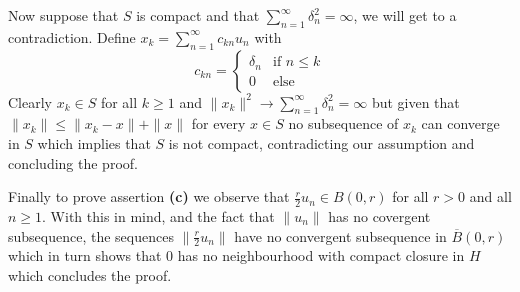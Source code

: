 \documentclass{article}
\begin{document}
\begin{exercise}
\bigbreak

Now suppose that $S$ is compact and that $\sum_{n=1}^{\infty} \delta_n^2 = \infty $, we will get to a contradiction. Define $x_k = \sum_{n=1}^{\infty} c_{kn}u_n $ with
\[
    c_{kn} = 
    \begin{cases}
        \delta_n & \text{if } n \le k \\
        0 & \text{else}
    \end{cases}
\]
Clearly $x_k \in S$ for all $k \ge 1$  and $\|x_k\|^2 \rightarrow \sum_{n=1}^{\infty} \delta_n^2 = \infty$ but given that $\|x_k\| \le \|x_k-x\| + \|x\|$ for every $x \in S$ no subsequence of $x_k$ can converge in $S$ which implies that $S$ is not compact, contradicting our assumption and concluding the proof.  

\bigbreak

Finally to prove assertion \textbf{(c)} we observe that $\frac{r}{2}u_n \in B \left( 0,r \right)$ for all $r > 0$ and all $n \ge 1$. With this in mind, and the fact that $\|u_n\|$ has no covergent subsequence, the sequences $\|\frac{r}{2}u_n\| $ have no convergent subsequence in $\overline{B} \left( 0,r \right) $ which in turn shows that $0$ has no neighbourhood with compact closure in $H$ which concludes the proof. 
\end{exercise}

\bigbreak
\end{document}
